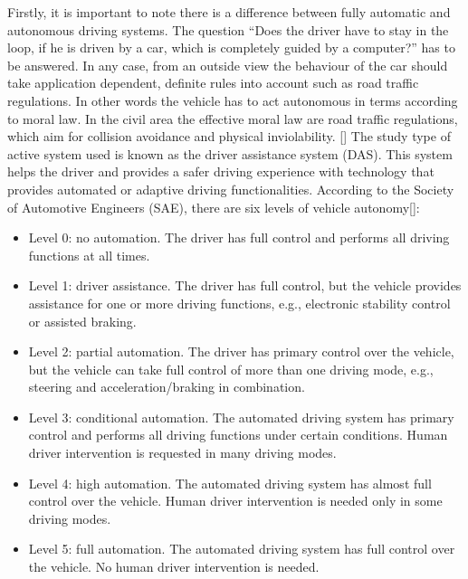 \documentclass{article}
\begin{document}
Firstly, it is important to note there is a difference between fully automatic and autonomous driving systems. The question “Does the driver have to stay in the loop, if he is driven by a car, which is completely guided by a computer?” has to be answered. In any case, from an outside view the behaviour of the car should take application dependent, definite rules into account such as road traffic regulations. In other words the vehicle has to act autonomous in terms according to moral law. In the civil area the effective moral law are road traffic regulations, which aim for collision avoidance and physical inviolability. [\textcite{horwick2010strategy}]
\bigbreak
The study type of active system used is known as the driver assistance system (DAS). This system helps the driver and provides a safer driving experience with technology that provides automated or adaptive driving functionalities. According to the Society of Automotive Engineers (SAE), there are six levels of vehicle autonomy[\textcite{curiel2019towards}]:
\bigbreak
\begin{itemize}
\item Level 0: no automation. The driver has full control and performs all driving functions at all times.

\item Level 1: driver assistance. The driver has full control, but the vehicle provides assistance for one or more driving functions, e.g., electronic stability control or assisted braking.

\item Level 2: partial automation. The driver has primary control over the vehicle, but the vehicle can take full control of more than one driving mode, e.g., steering and acceleration/braking in combination.

\item Level 3: conditional automation. The automated driving system has primary control and performs all driving functions under certain conditions. Human driver intervention is requested in many driving modes.

\item Level 4: high automation. The automated driving system has almost full control over the vehicle. Human driver intervention is needed only in some driving modes.

\item Level 5: full automation. The automated driving system has full control over the vehicle. No human driver intervention is needed.
\end{itemize}
\end{document}

